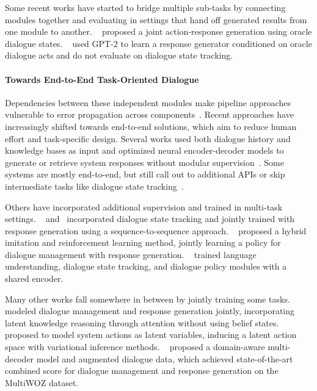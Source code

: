 \documentclass{article}
\begin{document}
Some recent works have started to bridge multiple sub-tasks by connecting modules together 
and evaluating in settings that hand off generated results from one module to another. 
~\citet{HDSA2019chen} proposed a joint action-response generation using oracle dialogue states.
~\citet{peng2020fewshot} used GPT-2 to learn a response generator conditioned on oracle dialogue acts 
and do not evaluate on dialogue state tracking. 



\paragraph{Towards End-to-End Task-Oriented Dialogue}
Dependencies between these independent modules make pipeline approaches vulnerable to error propagation across components~\citep{liu2018dialogue}. 
Recent approaches have increasingly shifted towards end-to-end solutions,
which aim to reduce human effort and task-specific design. 
Several works used both dialogue history and knowledge bases as input and optimized neural encoder-decoder models to generate or retrieve system responses without modular supervision~\citep{eric2017key, zhao2017generative, madotto2018mem2seq, wu2019global, wu2019alternating}.
Some systems are mostly end-to-end, but still call out to additional APIs or skip intermediate tasks like dialogue state tracking~\citep{bordes2017end2end}.

Others have incorporated additional supervision and trained in multi-task settings.
~\citet{lei2018sequicity} and~\citet{shu2018bsintotod} incorporated dialogue state tracking 
and jointly trained with response generation using a sequence-to-sequence approach.
~\citet{liu2018dialogue} proposed a hybrid imitation and reinforcement learning method, 
jointly learning a policy for dialogue management with response generation.
~\citet{wen2016network, liang2019moss} trained language understanding, 
dialogue state tracking, 
and dialogue policy modules with a shared encoder.

Many other works fall somewhere in between by jointly training some tasks.
\citet{neelakantan19assistant} modeled dialogue management and response generation jointly, 
incorporating latent knowledge reasoning through attention without using belief states. 
~\citet{zhao2019rethinking} proposed to model system actions as latent variables, 
inducing a latent action space with variational inference methods. 
~\citet{DAMD2019zhang} proposed a domain-aware multi-decoder model and augmented dialogue data, 
which achieved state-of-the-art combined score for dialogue management and response generation 
on the MultiWOZ dataset.
\end{document}
